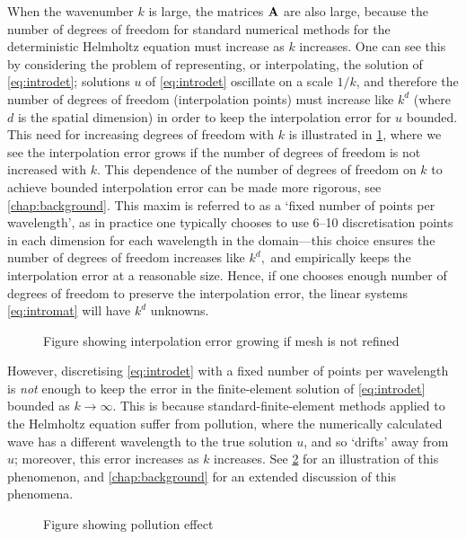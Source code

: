 When the wavenumber $k$ is large, the matrices $\mathbf{A}$ are also large, because the number of degrees of freedom for standard numerical methods for the deterministic Helmholtz equation must increase as $k$ increases. One can see this by considering the problem of representing, or interpolating, the solution of \eqref{eq:introdet}; solutions $u$ of \eqref{eq:introdet} oscillate on a scale $1/k$, and therefore the number of degrees of freedom (interpolation points) must increase like $k^d$ (where $d$ is the spatial dimension) in order to keep the interpolation error for $u$ bounded. This need for increasing degrees of freedom with $k$ is illustrated in \cref{fig:introinterp}, where we see the interpolation error grows if the number of degrees of freedom is not increased with $k$. This dependence of the number of degrees of freedom on $k$ to achieve bounded interpolation error can be made more rigorous, see \cref{chap:background}. This maxim is referred to as a `fixed number of points per wavelength', as in practice one typically chooses to use 6--10 discretisation points in each dimension for each wavelength in the domain---this choice ensures the number of degrees of freedom increases like $k^d,$ and empirically keeps the interpolation error at a reasonable size. Hence, if one chooses enough number of degrees of freedom to preserve the interpolation error, the linear systems \eqref{eq:intromat} will have $k^d$ unknowns. 

\begin{figure}
\caption{\label{fig:introinterp} Figure showing interpolation error growing if mesh is not refined}
\end{figure}

However, discretising \eqref{eq:introdet} with a fixed number of points per wavelength is \emph{not} enough to keep the error in the finite-element solution of \eqref{eq:introdet} bounded as $k\rightarrow \infty.$ This is because standard-finite-element methods applied to the Helmholtz equation suffer from pollution, where the numerically calculated wave has a different wavelength to the true solution $u$, and so `drifts' away from $u$; moreover, this error increases as $k$ increases. See \cref{fig:intropoll} for an illustration of this phenomenon, and \cref{chap:background} for an extended discussion of this phenomena.

\begin{figure}
\caption{\label{fig:intropoll} Figure showing pollution effect}
\end{figure}

